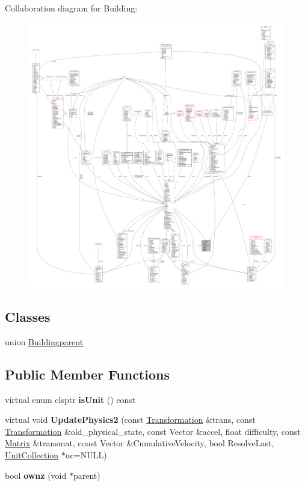 Collaboration diagram for Building\+:
\nopagebreak
\begin{figure}[H]
\begin{center}
\leavevmode
\includegraphics[width=350pt]{df/d9f/classBuilding__coll__graph}
\end{center}
\end{figure}
\subsection*{Classes}
\begin{DoxyCompactItemize}
\item 
union \hyperlink{unionBuilding_1_1Buildingparent}{Buildingparent}
\end{DoxyCompactItemize}
\subsection*{Public Member Functions}
\begin{DoxyCompactItemize}
\item 
virtual enum clsptr {\bfseries is\+Unit} () const \hypertarget{classBuilding_aa0c11e297f1bf5c6c46a0e3c79caca94}{}\label{classBuilding_aa0c11e297f1bf5c6c46a0e3c79caca94}

\item 
virtual void {\bfseries Update\+Physics2} (const \hyperlink{structTransformation}{Transformation} \&trans, const \hyperlink{structTransformation}{Transformation} \&old\+\_\+physical\+\_\+state, const Vector \&accel, float difficulty, const \hyperlink{classMatrix}{Matrix} \&transmat, const Vector \&Cumulative\+Velocity, bool Resolve\+Last, \hyperlink{classUnitCollection}{Unit\+Collection} $\ast$uc=N\+U\+LL)\hypertarget{classBuilding_a07f0a403144b48f3050c1e8e889d1adb}{}\label{classBuilding_a07f0a403144b48f3050c1e8e889d1adb}

\item 
bool {\bfseries ownz} (void $\ast$parent)\hypertarget{classBuilding_ac10dc9561fc9d6bdf986d7c8113e16c2}{}\label{classBuilding_ac10dc9561fc9d6bdf986d7c8113e16c2}

\end{DoxyCompactItemize}
